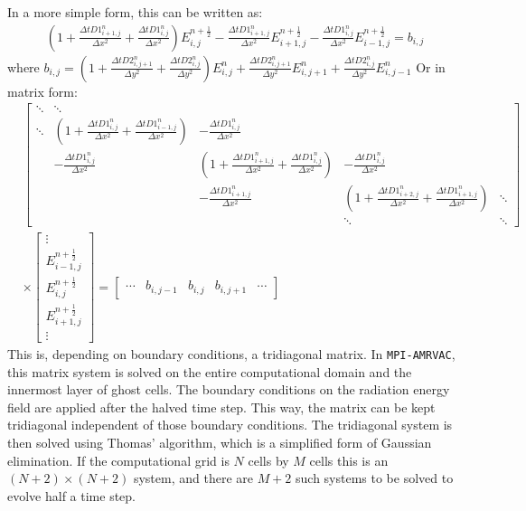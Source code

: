 In a more simple form, this can be written as:
\begin{align}
\left(1 + \frac{\Delta t D1_{i+1,j}^{n}}{\Delta x^2} + \frac{\Delta t D1_{i,j}^{n}}{\Delta x^2} \right) E_{i,j}^{n+\frac{1}{2}} - \frac{\Delta t D1_{i+1,j}^{n}}{\Delta x^2} E_{i+1,j}^{n+\frac{1}{2}} - \frac{\Delta t D1_{i,j}^{n}}{\Delta x^2} E_{i-1,j}^{n+\frac{1}{2}} = b_{i,j}
\end{align}
where $b_{i,j} = \left(1 + \frac{\Delta t D2_{i,j+1}^{n}}{\Delta y^2} + \frac{\Delta t D2_{i,j}^{n}}{\Delta y^2}\right) E_{i,j}^{n} + \frac{\Delta t D2_{i,j+1}^{n}}{\Delta y^2} E_{i,j+1}^{n} + \frac{\Delta t D2_{i,j}^{n}}{\Delta y^2} E_{i,j-1}^{n}$
Or in matrix form:
\begin{align}
&\begin{bmatrix}
\ddots & \ddots & & &\\
\ddots & \left(1 + \frac{\Delta t D1_{i,j}^{n}}{\Delta x^2} + \frac{\Delta t D1_{i-1,j}^{n}}{\Delta x^2} \right) & -\frac{\Delta t D1_{i,j}^{n}}{\Delta x^2} & & \\
& -\frac{\Delta t D1_{i,j}^{n}}{\Delta x^2} & \left(1 + \frac{\Delta t D1_{i+1,j}^{n}}{\Delta x^2} + \frac{\Delta t D1_{i,j}^{n}}{\Delta x^2} \right) & - \frac{\Delta t D1_{i,j}^{n}}{\Delta x^2} & \\
& & -\frac{\Delta t D1_{i+1,j}^{n}}{\Delta x^2} & \left(1 + \frac{\Delta t D1_{i+2,j}^{n}}{\Delta x^2} + \frac{\Delta t D1_{i+1,j}^{n}}{\Delta x^2} \right) & \ddots \\
& & & \ddots & \ddots
\end{bmatrix} \\
&\times
\begin{bmatrix}
           \vdots                    \\
           E_{i-1,j}^{n+\frac{1}{2}} \\
           E_{i,j}^{n+\frac{1}{2}}   \\
           E_{i+1,j}^{n+\frac{1}{2}} \\
           \vdots
\end{bmatrix} 
=
\begin{bmatrix}
           \cdots & b_{i,j-1} & b_{i,j} & b_{i,j+1} & \cdots
\end{bmatrix}
\end{align}
This is, depending on boundary conditions, a tridiagonal matrix. In \texttt{MPI-AMRVAC}, this matrix system is solved on the entire computational domain and the innermost layer of ghost cells. The boundary conditions on the radiation energy field are applied after the halved time step. This way, the matrix can be kept tridiagonal independent of those boundary conditions. The tridiagonal system is then solved using Thomas' algorithm, which is a simplified form of Gaussian elimination. If the computational grid is $N$ cells by $M$ cells this is an $(N+2) \times (N+2)$ system, and there are $M+2$ such systems to be solved to evolve half a time step. \\

